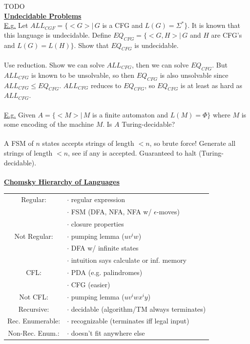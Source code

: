 \documentclass[8pt,letterpaper,twocolumn]{article}
\begin{document}
TODO
\\
\underline{\textbf{Undecidable Problems}} \\
\underline{E.g.} Let $ALL_{CGF} = \{<G> |\, G$ is a CFG and $L(G) = \Sigma^*\}$.
It is known that this language is undecidable.
Define $EQ_{CFG} = \{<G,H> |\, G$ and $H$ are CFG's and $L(G) = L(H)\}$.
Show that $EQ_{CFG}$ is undecidable. \\
\\
Use reduction. Show we can solve $ALL_{CFG}$, then we can solve $EQ_{CFG}$.
But $ALL_{CFG}$ is known to be unsolvable, so then $EQ_{CFG}$ is also unsolvable since
$ALL_{CFG} \leq EQ_{CFG}$. $ALL_{CFG}$ reduces to $EQ_{CFG}$, so $EQ_{CFG}$ is at least as hard
as $ALL_{CFG}$. \\
\\
\underline{E.g.} Given $A = \{<M> |\, M$ is a finite automaton and $L(M) = \Phi\}$
where $M$ is some encoding of the machine $M$. Is $A$ Turing-decidable? \\
\\
A FSM of $n$ states accepts strings of length $< n$, so brute force!
Generate all strings of length $< n$, see if any is accepted. Guaranteed to halt (Turing-decidable).\\
\\
\underline{\textbf{Chomsky Hierarchy of Languages}} \\
\begin{tabular}{c l}
Regular: & $\cdot$ regular expression \\
& $\cdot$ FSM (DFA, NFA, NFA w/ $\epsilon$-moves) \\
& $\cdot$ closure properties \\
Not Regular: & $\cdot$ pumping lemma ($uv^iw$)\\
& $\cdot$ DFA w/ infinite states \\
& $\cdot$ intuition says calculate or inf. memory \\
\hline
CFL: & $\cdot$ PDA (e.g. palindromes) \\
& $\cdot$ CFG (easier) \\
Not CFL: & $\cdot$ pumping lemma ($uv^iwx^iy$) \\
\hline
Recursive: & $\cdot$ decidable (algorithm/TM always terminates) \\
Rec. Enumerable: & $\cdot$ recognizable (terminates iff legal input) \\
Non-Rec. Enum.: & $\cdot$ doesn't fit anywhere else \\
\hline
\end{tabular}
\end{document}
